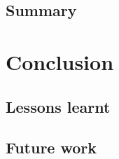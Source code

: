\documentclass[12pt,twoside,notitlepage]{report}
\begin{document}
	\section{Summary}
	
\cleardoublepage
\chapter{Conclusion}
	\section{Lessons learnt}
	\section{Future work}

\cleardoublepage

\end{document}
